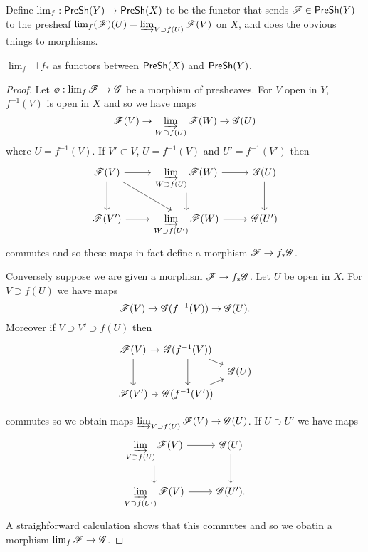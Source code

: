 \documentclass{memoir}
\begin{document}
Define $\lim_f:{\normalfont\mathsf{PreSh}}(Y)\to{\normalfont\mathsf{PreSh}}(X)$ to be the functor that sends $\mathscr{F}\in {\normalfont\mathsf{PreSh}}(Y)$ to the presheaf $\lim_f(\mathscr{F})(U) = \varinjlim_{V\supset f(U)}\mathscr{F}(V)$ on $X$, and does the obvious things to morphisms.
\begin{thm}
    $\lim_f\dashv f_*$ as functors between ${\normalfont\mathsf{PreSh}}(X)$ and ${\normalfont\mathsf{PreSh}}(Y)$.
\end{thm}
\begin{proof}
    Let $\phi:\lim_f\mathscr{F}\to \mathscr{G}$ be a morphism of presheaves.
    For $V$ open in $Y$, $f^{-1}(V)$ is open in $X$ and so we have maps
    \begin{equation}
        \mathscr{F}(V)\to\varinjlim_{W\supset f(U)}\mathscr{F}(W) \to \mathscr{G}(U)
    \end{equation}
    where $U=f^{-1}(V)$.
    If $V'\subset V$, $U = f^{-1}(V)$ and $U'=f^{-1}(V')$ then
    \begin{equation}
        \begin{tikzcd}
            \shf{F}(V) \arrow[r] \arrow[d] \arrow[dr] & \displaystyle\varinjlim_{W\supset f(U)}\shf{F}(W) \arrow[r] \arrow[d] & \shf{G}(U) \arrow[d] \\
            \shf{F}(V') \arrow[r] & \displaystyle\varinjlim_{W\supset f(U')}\shf{F}(W) \arrow[r] & \shf{G}(U')
        \end{tikzcd}
    \end{equation}
    commutes and so these maps in fact define a morphism $\mathscr{F}\to f_*\mathscr{G}$.

    Conversely suppose we are given a morphism $\mathscr{F}\to f_*\mathscr{G}$.
    Let $U$ be open in $X$.
    For $V\supset f(U)$ we have maps
    \begin{equation}
        \mathscr{F}(V)\to \mathscr{G}(f^{-1}(V)) \to \mathscr{G}(U).
    \end{equation}
    Moreover if $V\supset V'\supset f(U)$ then
    \begin{equation}
        \begin{tikzcd}[column sep=tiny,row sep=tiny]
            \shf{F}(V) \arrow[r] \arrow[dd] & \shf{G}(f^{-1}(V)) \arrow[dd] \arrow[dr] & \\ 
                                 & & \shf{G}(U) \\
            \shf{F}(V') \arrow[r] & \shf{G}(f^{-1}(V')) \arrow[ur] & \\ 
        \end{tikzcd}
    \end{equation}
    commutes so we obtain maps $\varinjlim_{V\supset f(U)}\mathscr{F}(V)\to\mathscr{G}(U)$.
    If $U\supset U'$ we have maps
    \begin{equation}
        \begin{tikzcd}
            \displaystyle \varinjlim_{V\supset f(U)}\shf{F}(V) \arrow[r] \arrow[d] & \shf{G}(U) \arrow[d] \\ 
            \displaystyle \varinjlim_{V\supset f(U')}\shf{F}(V) \arrow[r] & \shf{G}(U').
        \end{tikzcd}
    \end{equation}
    A straighforward calculation shows that this commutes and so we obatin a morphism $\lim_f\mathscr{F}\to\mathscr{G}$.


\end{proof}
\end{document}
